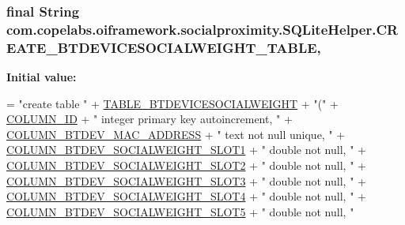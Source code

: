 \subsubsection[{C\+R\+E\+A\+T\+E\+\_\+\+B\+T\+D\+E\+V\+I\+C\+E\+S\+O\+C\+I\+A\+L\+W\+E\+I\+G\+H\+T\+\_\+\+T\+A\+B\+L\+E}]{\setlength{\rightskip}{0pt plus 5cm}final String com.\+copelabs.\+oiframework.\+socialproximity.\+S\+Q\+Lite\+Helper.\+C\+R\+E\+A\+T\+E\+\_\+\+B\+T\+D\+E\+V\+I\+C\+E\+S\+O\+C\+I\+A\+L\+W\+E\+I\+G\+H\+T\+\_\+\+T\+A\+B\+L\+E\hspace{0.3cm}{\ttfamily [static]}, {\ttfamily [private]}}\label{classcom_1_1copelabs_1_1oiframework_1_1socialproximity_1_1_s_q_lite_helper_a707bd95f431fe1ef0833da31f30cfb94}
{\bfseries Initial value\+:}
\begin{DoxyCode}
= \textcolor{stringliteral}{"create table "}
              + \hyperlink{classcom_1_1copelabs_1_1oiframework_1_1socialproximity_1_1_s_q_lite_helper_ad91da6d89af9550e074a14a62f3366b1}{TABLE\_BTDEVICESOCIALWEIGHT} + \textcolor{stringliteral}{"("}
              + \hyperlink{classcom_1_1copelabs_1_1oiframework_1_1socialproximity_1_1_s_q_lite_helper_a42da605a2e3ade18adf5dd701eb48b06}{COLUMN\_ID} + \textcolor{stringliteral}{" integer primary key autoincrement, "}
              + \hyperlink{classcom_1_1copelabs_1_1oiframework_1_1socialproximity_1_1_s_q_lite_helper_aa664c2d0219f93cc556b30e4b48954c1}{COLUMN\_BTDEV\_MAC\_ADDRESS} + \textcolor{stringliteral}{" text not null unique, "}
              + \hyperlink{classcom_1_1copelabs_1_1oiframework_1_1socialproximity_1_1_s_q_lite_helper_a80219e5fd45b8c4b9d40d28f5af0f9bf}{COLUMN\_BTDEV\_SOCIALWEIGHT\_SLOT1} + \textcolor{stringliteral}{" double not null, "}
              + \hyperlink{classcom_1_1copelabs_1_1oiframework_1_1socialproximity_1_1_s_q_lite_helper_a2ed802bd725b28c7db4a48e763fcdab6}{COLUMN\_BTDEV\_SOCIALWEIGHT\_SLOT2} + \textcolor{stringliteral}{" double not null, "}
              + \hyperlink{classcom_1_1copelabs_1_1oiframework_1_1socialproximity_1_1_s_q_lite_helper_a052288f997cdfa0cb4d22d99aea9daca}{COLUMN\_BTDEV\_SOCIALWEIGHT\_SLOT3} + \textcolor{stringliteral}{" double not null, "}
              + \hyperlink{classcom_1_1copelabs_1_1oiframework_1_1socialproximity_1_1_s_q_lite_helper_a6eb4180bb35f069af2cb5840a9d0954a}{COLUMN\_BTDEV\_SOCIALWEIGHT\_SLOT4} + \textcolor{stringliteral}{" double not null, "}
              + \hyperlink{classcom_1_1copelabs_1_1oiframework_1_1socialproximity_1_1_s_q_lite_helper_a35fdea94610378cd5967262bd9b4fad7}{COLUMN\_BTDEV\_SOCIALWEIGHT\_SLOT5} + \textcolor{stringliteral}{" double not null, "}

\end{DoxyCode}
